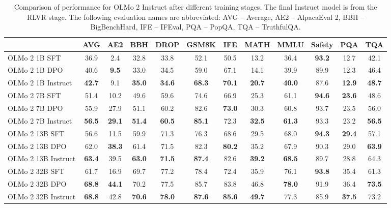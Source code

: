 \documentclass[table]{ai2style/ai2}
\begin{document}
\begin{table}[t]
\centering
\setlength\tabcolsep{3pt}
{\footnotesize
\begin{tabular}{lccccccccccc}
\toprule
    & 
    \textbf{AVG} & 
    \textbf{AE2} & 
    \textbf{BBH} & 
    \textbf{DROP} & 
    \textbf{GSM8K} & 
    \textbf{IFE} & 
    \textbf{MATH} & 
    \textbf{MMLU} & 
    \textbf{Safety} & 
    \textbf{PQA} & 
    \textbf{TQA} \\
\midrule
OLMo 2 1B SFT & 36.9 & 2.4 & 32.8 & 33.8 & 52.1 & 50.5 & 13.2 & 36.4 & \bf{93.2} & 12.7 & 42.1 \\

\rowcolor{ai2offwhite} OLMo 2 1B DPO & 40.6 & \bf{9.5} & 33.0 & 34.5 & 59.0 & 67.1 & 14.1 & 39.9 & 89.9 & 12.3 & 46.4 \\

\rowcolor{ai2lightpink} OLMo 2 1B Instruct & \bf{42.7} & 9.1 & \bf{35.0} & \bf{34.6} & \bf{68.3} & \bf{70.1} & \bf{20.7} & \bf{40.0} & 87.6 & \bf{12.9} & \bf{48.7}
\\\midrule

OLMo 2 7B SFT & 51.4 & 10.2   & 49.6 & 59.6 & 74.6 & 66.9 & 25.3 & 61.1 & \bf{94.6} & \bf{23.6} & 48.6 \\
\rowcolor{ai2offwhite} OLMo 2 7B DPO & 55.9 & 27.9 & 51.1   & 60.2 & 82.6 & \bf{73.0} & 30.3 & 60.8 & 93.7 & 23.5 & 56.0 \\
 \rowcolor{ai2lightpink}   OLMo 2 7B Instruct & \bf{56.5} & \bf{29.1}   & \bf{51.4} & \bf{60.5} & \bf{85.1} & 72.3 & \bf{32.5} & \bf{61.3} & 93.3 & 23.2 & \bf{56.5} \\ \midrule
 OLMo 2 13B SFT & 56.6 & 11.5   & 59.9 & 71.3 & 76.3 & 68.6 & 29.5 & 68.0 & \bf{94.3} & \bf{29.4} & 57.1 \\
 \rowcolor{ai2offwhite}  OLMo 2 13B DPO & 62.0 & \bf{38.3} & 61.4 & 71.5 & 82.3 & \bf{80.2} & 35.2 & 67.9 & 90.3 & 29.0 & \bf{63.9} \\
 \rowcolor{ai2lightpink}  OLMo 2 13B Instruct & \bf{63.4} & 39.5 & \bf{63.0} & \bf{71.5} & \bf{87.4} & 82.6 & \bf{39.2} & \bf{68.5} & 89.7 & 28.8 & 64.3 \\ \midrule
 OLMo 2 32B SFT & 61.7 & 16.9 & 69.7 & 77.2 & 78.4 & 72.4 & 35.9 & 76.1 & \bf{93.8} & 35.4 & 61.3 \\
 \rowcolor{ai2offwhite} OLMo 2 32B DPO & \bf{68.8} & \bf{44.1} & 70.2 & 77.5 & 85.7 & 83.8 & 46.8 & \bf{78.0} & 91.9 & 36.4 & \bf{73.5} \\
 \rowcolor{ai2lightpink} OLMo 2 32B Instruct & \bf{68.8} & 42.8 & \bf{70.6} & \bf{78.0} & \bf{87.6} & \bf{85.6} & \bf{49.7} & 77.3 & 85.9 & \bf{37.5} & 73.2 \\
\bottomrule
\end{tabular}
}
\caption{Comparison of performance for OLMo 2 Instruct after different training stages. The final Instruct model is from the RLVR stage.
The following evaluation names are abbreviated: AVG -- Average, AE2 -- AlpacaEval 2, BBH -- BigBenchHard, IFE -- IFEval, PQA -- PopQA, TQA -- TruthfulQA.
}
\label{tab:instruct_stages}
\end{table}
\end{document}
